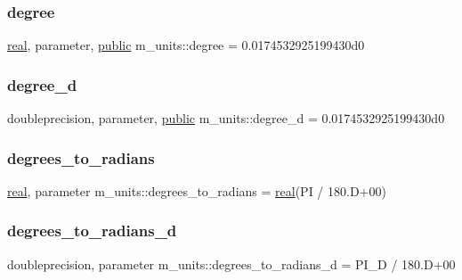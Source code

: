 \subsubsection{\texorpdfstring{degree}{degree}}
{\footnotesize\ttfamily \hyperlink{read__watch_83_8txt_abdb62bde002f38ef75f810d3a905a823}{real}, parameter, \hyperlink{M__stopwatch_83_8txt_a2f74811300c361e53b430611a7d1769f}{public} m\+\_\+units\+::degree = 0.\+0174532925199430d0}

\mbox{\label{namespacem__units_a00df65cb71220d4fe1c654d5b4ba4851}} 
\subsubsection{\texorpdfstring{degree\+\_\+d}{degree\_d}}
{\footnotesize\ttfamily doubleprecision, parameter, \hyperlink{M__stopwatch_83_8txt_a2f74811300c361e53b430611a7d1769f}{public} m\+\_\+units\+::degree\+\_\+d = 0.\+0174532925199430d0}

\mbox{\label{namespacem__units_a37687a78d45e4bcf4fa6b76ca11eb02b}} 
\subsubsection{\texorpdfstring{degrees\+\_\+to\+\_\+radians}{degrees\_to\_radians}}
{\footnotesize\ttfamily \hyperlink{read__watch_83_8txt_abdb62bde002f38ef75f810d3a905a823}{real}, parameter m\+\_\+units\+::degrees\+\_\+to\+\_\+radians = \hyperlink{read__watch_83_8txt_abdb62bde002f38ef75f810d3a905a823}{real}(PI / 180.\+D+00)\hspace{0.3cm}{\ttfamily [private]}}

\mbox{\label{namespacem__units_a74de2022908d613a91b83f9521460f6f}} 
\subsubsection{\texorpdfstring{degrees\+\_\+to\+\_\+radians\+\_\+d}{degrees\_to\_radians\_d}}
{\footnotesize\ttfamily doubleprecision, parameter m\+\_\+units\+::degrees\+\_\+to\+\_\+radians\+\_\+d = P\+I\+\_\+D / 180.\+D+00\hspace{0.3cm}{\ttfamily [private]}}

